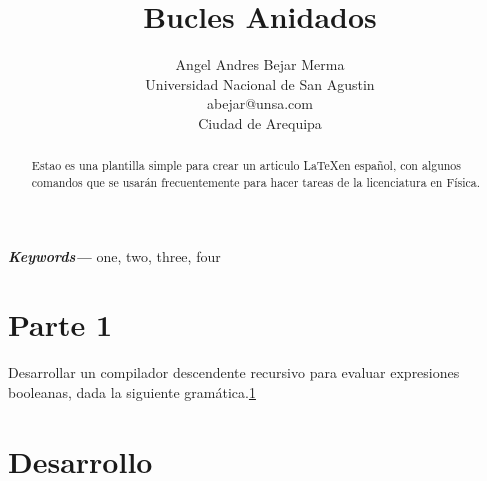 \documentclass[12pt]{article}
\title{Bucles Anidados }
\author{Angel Andres Bejar Merma\\
  \small Universidad Nacional de San Agustin\\
  \small abejar@unsa.com\\
  \small Ciudad de Arequipa
}
\providecommand{\keywords}[1]
{
  \small	
  \textbf{\textit{Keywords---}} #1
}
\begin{document}
%

%


\maketitle

\begin{abstract}
    Estao es una plantilla simple para crear un articulo \LaTeX en español, con algunos comandos que se usarán frecuentemente para hacer tareas de la licenciatura en Física.
    \end{abstract}
    
    \keywords{one, two, three, four}







\section{Parte 1}

Desarrollar un compilador descendente recursivo para evaluar expresiones booleanas,
dada la siguiente gramática.\ref{fig:1}




\begin{figure}[H]%
\centering
\caption{}
\label{fig:1}
\end{figure}


\begin{figure}[H]%
\centering
\caption*{}

\end{figure}


\begin{figure}[H]%
\centering
\caption*{}

\end{figure}
\newpage
\section{Desarrollo}
\newpage
\end{document}
